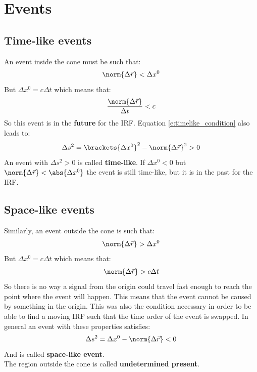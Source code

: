 \section{Events}
\subsection{Time-like events}
An event inside the cone must be such that:
\begin{equation} \label{e:timelike_condition}
  \norm{\Delta \vec{r}} < \Delta x^0
\end{equation}
But $\Delta x^0 = c\Delta t$ which means that:
\begin{equation}
  \dfrac{\norm{\Delta \vec{r}}}{\Delta t} < c
\end{equation}
So this event is in the \textbf{future} for the IRF. Equation \eqref{e:timelike_condition} also leads to:
\begin{equation}
  \Delta s^2 = \brackets{\Delta x^0}^2 - \norm{\Delta \vec{r}}^2 > 0
\end{equation}
An event with $\Delta s^2 > 0$ is called \textbf{time-like}. If $\Delta x^0 < 0$ but $\norm{\Delta \vec{r}} < \abs{\Delta x^0}$ the event is still time-like, but it is in the past for the IRF.
\subsection{Space-like events}
Similarly, an event outside the cone is such that:
\begin{equation} \label{e:spacelike_condition}
  \norm{\Delta \vec{r}} > \Delta x^0
\end{equation}
But $\Delta x^0 = c\Delta t$ which means that:
\begin{equation}
  \norm{\Delta \vec{r}} > c\Delta t
\end{equation}
So there is no way a signal from the origin could travel fast enough to reach the point where the event will happen. This means that the event cannot be caused by something in the origin. This was also the condition necessary in order to be able to find a moving IRF such that the time order of the event is swapped.
In general an event with these properties satisfies:
\begin{equation}
  \Delta s^2 = \Delta x^0 - \norm{\Delta \vec{r}} < 0
\end{equation}
And is called \textbf{space-like event}.\\
The region outside the cone is called \textbf{undetermined present}.\\
